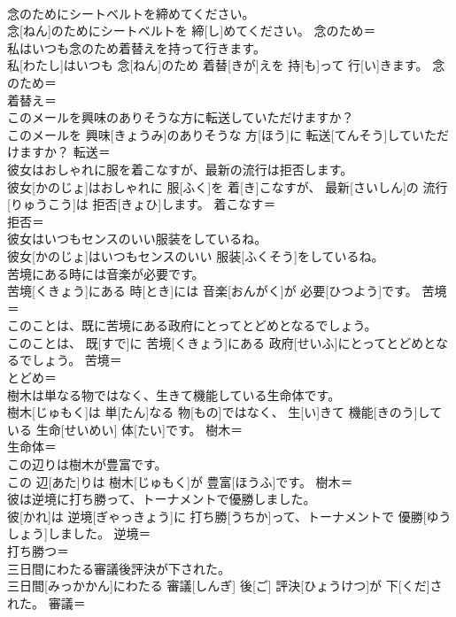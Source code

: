 \documentclass[8pt]{extreport}
\begin{document}
\begin{CJK}{UTF8}{min}
\\	念のためにシートベルトを締めてください。	
\\	念[ねん]のためにシートベルトを 締[し]めてください。	念のため＝ 
\\	私はいつも念のため着替えを持って行きます。	
\\	私[わたし]はいつも 念[ねん]のため 着替[きが]えを 持[も]って 行[い]きます。	念のため＝ 
\\	着替え＝ 
\\	このメールを興味のありそうな方に転送していただけますか？	
\\	このメールを 興味[きょうみ]のありそうな 方[ほう]に 転送[てんそう]していただけますか？	転送＝ 
\\	彼女はおしゃれに服を着こなすが、最新の流行は拒否します。	
\\	彼女[かのじょ]はおしゃれに 服[ふく]を 着[き]こなすが、 最新[さいしん]の 流行[りゅうこう]は 拒否[きょひ]します。	着こなす＝ 
\\	拒否＝ 
\\	彼女はいつもセンスのいい服装をしているね。	
\\	彼女[かのじょ]はいつもセンスのいい 服装[ふくそう]をしているね。	
\\	苦境にある時には音楽が必要です。	
\\	苦境[くきょう]にある 時[とき]には 音楽[おんがく]が 必要[ひつよう]です。	苦境＝ 
\\	このことは、既に苦境にある政府にとってとどめとなるでしょう。	
\\	このことは、 既[すで]に 苦境[くきょう]にある 政府[せいふ]にとってとどめとなるでしょう。	苦境＝ 
\\	とどめ＝ 
\\	樹木は単なる物ではなく、生きて機能している生命体です。	
\\	樹木[じゅもく]は 単[たん]なる 物[もの]ではなく、 生[い]きて 機能[きのう]している 生命[せいめい] 体[たい]です。	樹木＝ 
\\	生命体＝ 
\\	この辺りは樹木が豊富です。	
\\	この 辺[あた]りは 樹木[じゅもく]が 豊富[ほうふ]です。	樹木＝ 
\\	彼は逆境に打ち勝って、トーナメントで優勝しました。	
\\	彼[かれ]は 逆境[ぎゃっきょう]に 打ち勝[うちか]って、トーナメントで 優勝[ゆうしょう]しました。	逆境＝ 
\\	打ち勝つ＝ 
\\	三日間にわたる審議後評決が下された。	
\\	三日間[みっかかん]にわたる 審議[しんぎ] 後[ご] 評決[ひょうけつ]が 下[くだ]された。	審議＝ 

\end{CJK}
\end{document}
